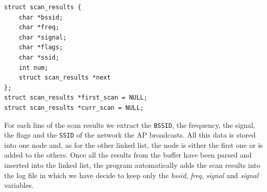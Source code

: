 \begin{description}
\begin{lstlisting}[frame=single,breaklines=true,caption={\texttt{scan\_results} structure}]
struct scan_results {
	char *bssid;
	char *freq;
	char *signal;
	char *flags;
	char *ssid;
	int num;
	struct scan_results *next
};
struct scan_results *first_scan = NULL;
struct scan_results *curr_scan = NULL;
\end{lstlisting}
	
	For each line of the scan results we extract the \texttt{BSSID}, the frequency, the signal, the flags and the \texttt{SSID} of the network the AP broadcasts. All this data is stored into one node and, as for the other linked list, the node is either the first one or is added to the others. Once all the results from the buffer have been parsed and inserted into the linked list, the program automatically adds the scan results into the log file in which we have decide to keep only the \textit{bssid}, \textit{freq}, \textit{signal} and \textit{signal} variables.


\end{description}
